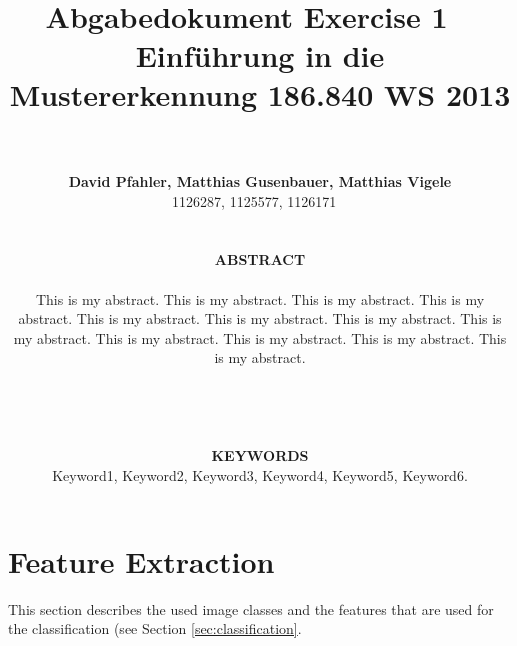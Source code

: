 \documentclass[a4paper,psfig,subfigure,epsfig,fleqn,amssmb,float,caption,fontenc,ausarbeitung]{article}
\begin{document}
\date{}

\title{~\\
  ~\\
  \fontsize{14}{14pt} \bf Abgabedokument Exercise 1
	 ~\\
  \fontsize{12}{12pt} \bf Einführung in die Mustererkennung 186.840 WS 2013}

\author{~\\
  ~\\
  \fontsize{12}{12pt}
  {\bf David Pfahler, Matthias Gusenbauer, Matthias Vigele}\\
  1126287, 1125577, 1126171
  ~\\ ~\\ ~\\
  \normalsize
  {\bf ABSTRACT} \\ 
  \noindent
  \hspace{0.2cm}
  \begin{minipage}[c]{15cm}
  \normalsize This is my abstract.  This is my abstract.  This is my
    abstract.  This is my abstract.  This is my abstract.  This is my
    abstract.  This is my abstract.  This is my abstract.  This is my
    abstract.  This is my abstract.  This is my abstract.  This is my
    abstract.\\
  \end{minipage}
  ~\\ ~\\ ~\\
  \normalsize
  {\bf KEYWORDS} \\ 
  \normalsize
  Keyword1, Keyword2, Keyword3, Keyword4, Keyword5, Keyword6.
  }

\maketitle
\normalfont
\thispagestyle{empty}


\section{Feature Extraction}
\label{sec:featureExtraction}

This section describes the used image classes and the features that are used for the classification (see Section \ref{sec:classification}. 
\end{document}
